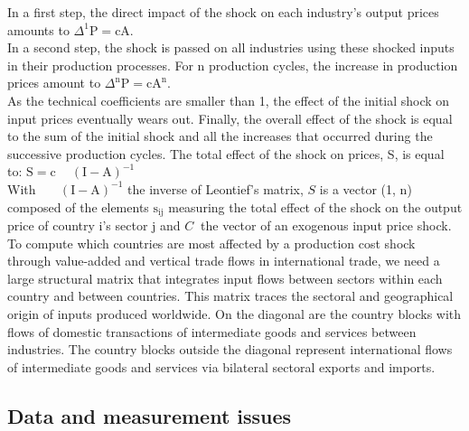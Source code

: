 \documentclass[11pt,a4paper]{article}
\begin{document}
In a first step, the direct impact of the shock on each industry's output prices amounts to ${{\Delta }^{1}}\text{P}=\text{cA}$.\\
In a second step, the shock is passed on all industries using these shocked inputs in their production processes. For n production cycles, the increase in production prices amount to ${{\Delta }^{\text{n}}}\text{P}=\text{c}{{\text{A}}^{\text{n}}}$.\\
As the technical coefficients are smaller than 1, the effect of the initial shock on input prices eventually wears out. Finally, the overall effect of the shock is equal to the sum of the initial shock and all the increases that occurred during the successive production cycles. The total effect of the shock on prices, S, is equal to: 
	$\text{S}=\text{c }\!\!~\!\!\text{ }{{\left( \text{I}-\text{A} \right)}^{-1}}$\\
With $\text{ }\!\!~\!\!\text{ }{{\left( \text{I}-\text{A} \right)}^{-1}}$ the inverse of Leontief's matrix, $S$ is a vector (1, n) composed of the elements ${{\text{s}}_{\text{ij}}}$ measuring the total effect of the shock on the output price of country i's sector j and $C~$ the vector of an exogenous input price shock.\\
To compute which countries are most affected by a production cost shock through value-added and vertical trade flows in international trade, we need a large structural matrix that integrates input flows between sectors within each country and between countries. This matrix traces the sectoral and geographical origin of inputs produced worldwide. On the diagonal are the country blocks with flows of domestic transactions of intermediate goods and services between industries. The country blocks outside the diagonal represent international flows of intermediate goods and services via bilateral sectoral exports and imports. 


\subsection{Data and measurement issues}
\label{subsec:data}
\end{document}
